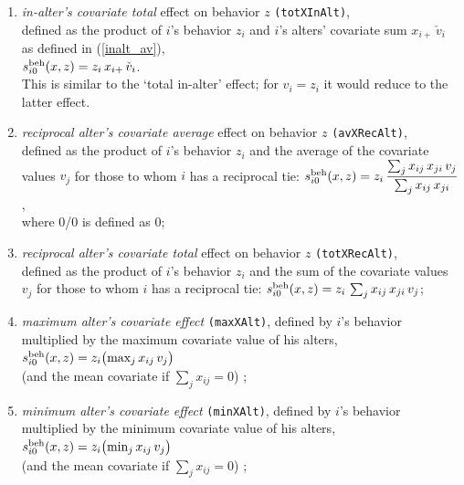 \documentclass[a4paper,fleqn,11pt]{article}
\newcommand{\+}{\, + \,}
\newcommand{\vit}{\theenumi}
\begin{document}
\begin{enumerate}
\item \emph{in-alter's covariate total } effect on behavior $z$
 \texttt{(totXInAlt)},\\
      defined as the product of $i$'s behavior $z_i$ and
      $i$'s alters' covariate sum $x_{i+}\,\check v_i$ as defined
      in (\ref{inalt_av}),\\
       $s^{\rm beh}_{i\vit}(x, z) = z_i \, x_{i+}\, \check v_i $.\\
      This is similar to the `total in-alter' effect; for
      $v_i = z_i$ it would reduce to the latter effect.


\item \emph{reciprocal alter's covariate average } effect on behavior $z$
 \texttt{(avXRecAlt)},\\
      defined as the product of $i$'s behavior $z_i$ and
      the average of the covariate values $v_j$
      for those to whom $i$ has a reciprocal tie:
       $s^{\rm beh}_{i\vit}(x, z) = z_i \,  \displaystyle
            \frac{\sum_j x_{ij}\,x_{ji} \, v_j }{\sum_j x_{ij}\,x_{ji} }$,\\
      where 0/0 is defined as 0;

\item \emph{reciprocal alter's covariate total } effect on behavior $z$
 \texttt{(totXRecAlt)},\\
      defined as the product of $i$'s behavior $z_i$ and
      the sum of the covariate values $v_j$
      for those to whom $i$ has a reciprocal tie:
       $s^{\rm beh}_{i\vit}(x, z) = z_i \,
            \sum_j x_{ij}\,x_{ji} \, v_j $; \\


 \item {\em maximum alter's covariate effect} \texttt{(maxXAlt)},
 defined by  $i$'s
 behavior multiplied by the maximum covariate value of his alters, \\
 $s^{\rm beh}_{i\vit}(x, z) =  z_i \big( \text{max}_j \, x_{ij}\, v_j \big) $\\
 (and the mean covariate if $\sum_j x_{ij} = 0$) ;

 \item {\em minimum alter's covariate effect} \texttt{(minXAlt)},
 defined by  $i$'s
 behavior multiplied by the minimum covariate value of his alters, \\
 $s^{\rm beh}_{i\vit}(x, z) =  z_i \big( \text{min}_j \, x_{ij}\, v_j \big) $\\
 (and the mean covariate if $\sum_j x_{ij} = 0$) ;



\end{enumerate}
\end{document}
